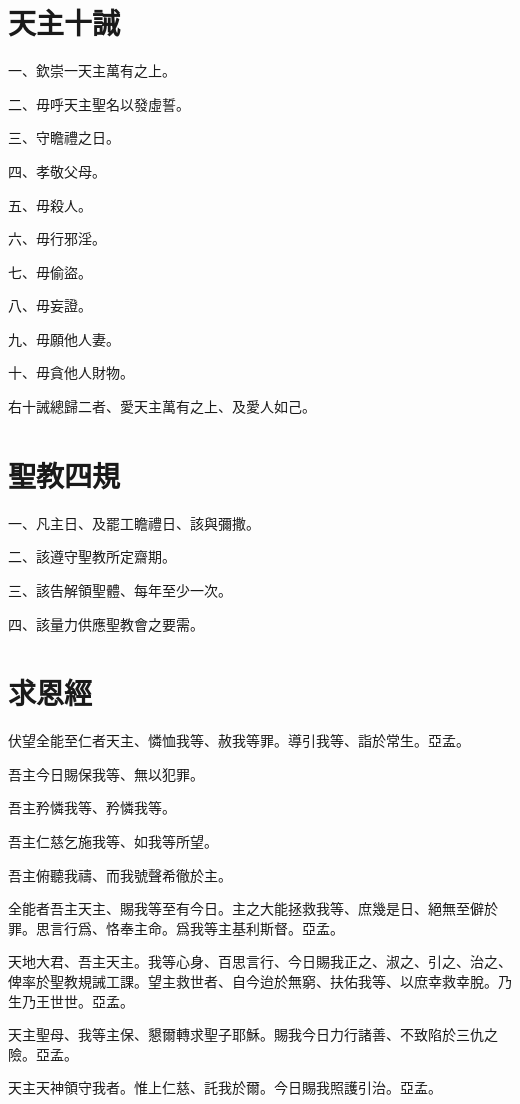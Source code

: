\section*{天主十誡}
\noindent 一、欽崇一天主萬有之上。

\noindent 二、毋呼天主聖名以發虛誓。

\noindent 三、守瞻禮之日。

\noindent 四、孝敬父母。

\noindent 五、毋殺人。

\noindent 六、毋行邪淫。

\noindent 七、毋偷盜。

\noindent 八、毋妄證。

\noindent 九、毋願他人妻。

\noindent 十、毋貪他人財物。

{\small 右十誡總歸二者、愛天主萬有之上、及愛人如己。}


\section*{聖教四規}
\noindent 一、凡主日、及罷工瞻禮日、該與彌撒。

\noindent 二、該遵守聖教所定齋期。

\noindent 三、該告解領聖體、每年至少一次。

\noindent 四、該量力供應聖教會之要需。

\section*{求恩經}
伏望全能至仁者天主、憐恤我等、赦我等罪。導引我等、詣於常生。{\cspace}亞孟。

吾主今日賜保我等、無以犯罪。

吾主矜憐我等、矜憐我等。

吾主仁慈乞施我等、如我等所望。

吾主俯聽我禱、而我號聲希徹於主。

全能者吾主天主、賜我等至有今日。主之大能拯救我等、庶幾是日、絕無至僻於罪。思言行爲、恪奉主命。爲我等主基利斯督。{\cspace}亞孟。

天地大君、吾主天主。我等心身、百思言行、今日賜我正之、淑之、引之、治之、俾率於聖教規誡工課。望主救世者、自今迨於無窮、扶佑我等、以庶幸救幸脫。乃生乃王世世。{\cspace}亞孟。

天主聖母、我等主保、懇爾轉求聖子耶穌。賜我今日力行諸善、不致陷於三仇之險。{\cspace}亞孟。

天主天神領守我者。惟上仁慈、託我於爾。今日賜我照護引治。{\cspace}亞孟。

